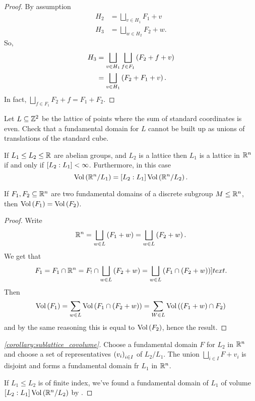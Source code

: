 \documentclass[11pt]{article}
\begin{document}
\begin{proof}
By assumption
\begin{align*}
H_2 &= \bigsqcup_{v \in H_1} F_1 + v \\
H_3 &= \bigsqcup_{w \in H_2} F_2 + w \text{.}
\end{align*}
So,
\begin{align*}
H_3 &= \bigsqcup_{v \in H_1} \bigsqcup_{f \in F_1} \left( F_2 + f + v \right)
\\&= \bigsqcup_{v \in H_1} \left( F_2 + F_1 + v \right) \text{.}
\end{align*}
In fact, $\bigsqcup_{f \in F_1} F_2 + f = F_1 + F_2$.
\end{proof}

\begin{exercise}
Let $L \subseteq \mathbb{Z}^2$ be the lattice of points where the sum of standard coordinates is even. Check that a fundamental domain for $L$ cannot be built up as unions of translations of the standard cube.
\end{exercise}

\begin{corollary}\label{corollary:sublattice_covolume}
If $L_1 \leq L_2 \leq \mathbb{R}$ are abelian groups, and $L_2$ is a lattice then $L_1$ is a lattice in $\mathbb{R}^n$ if and only if $\left[ L_2 : L_1 \right] < \infty$.
Furthermore, in this case
\[\mathrm{Vol}\left( \mathbb{R}^n / L_1 \right) = \left[ L_2 : L_1 \right] \mathrm{Vol}\left( \mathbb{R}^n / L_2 \right) \text{.}\]
\end{corollary}

\begin{lemma}\label{lemma:fd_volume}
If $F_1, F_2 \subseteq \mathbb{R}^n$ are two fundamental domains of a discrete subgroup $M \leq \mathbb{R}^n$, then $\mathrm{Vol}\left( F_1 \right) = \mathrm{Vol}\left( F_2 \right)$.
\end{lemma}

\begin{proof}
Write
\[\mathbb{R}^n = \bigsqcup_{w \in L} \left( F_1 + w \right) = \bigsqcup_{w \in L} \left( F_2 + w \right) \text{.}\]
We get that
\[F_1 = F_1 \cap \mathbb{R}^n = F_! \cap \bigsqcup_{w \in L} \left( F_2 + w \right) = \bigsqcup_{w \in L} \left( F_1 \cap \left( F_2 + w \right) \right) ]text{.}\]
Then
\[\mathrm{Vol}\left( F_1 \right) = \sum_{w \in L} \mathrm{Vol}\left( F_1 \cap \left( F_2 + w \right) \right) = \sum_{W \in L}\mathrm{Vol}\left( \left( F_1 + w \right) \cap F_2 \right)\]
and by the same reasoning this is equal to $\mathrm{Vol}\left( F_2 \right)$, hence the result.
\end{proof}

\begin{proof}[\ref{corollary:sublattice_covolume}]
Choose a fundamental domain $F$ for $L_2$ in $\mathbb{R}^n$ and choose a set of representatives $\left( v_i \right)_{i \in I}$ of $L_2 / L_1$. The union $\bigsqcup_{i \in I} F + v_i$ is disjoint and forms a fundamental domain fr $L_1$ in $\mathbb{R}^n$.

If $L_1 \leq L_2$ is of finite index, we've found a fundamental domain of $L_1$ of volume $\left[ L_2 : L_1 \right] \mathrm{Vol}\left( \mathbb{R}^n / L_2 \right)$ by . 
\end{proof}
\end{document}
